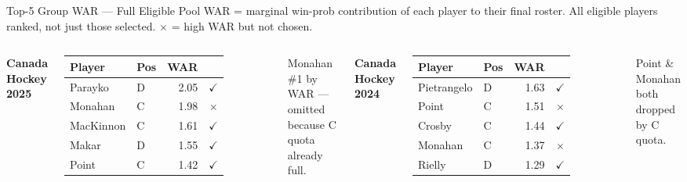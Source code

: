 \documentclass[aspectratio=169,11pt]{beamer}
\newcommand{\good}[1]{\textcolor{bgrn}{\textbf{#1}}}
\newcommand{\bad}[1]{\textcolor{bred}{\textbf{#1}}}
\begin{document}
\begin{frame}{Top-5 Group WAR — Full Eligible Pool}
{\small\color{steel}WAR = marginal win-prob contribution of each player to their final roster. All eligible players ranked, not just those selected. \bad{$\times$} = high WAR but not chosen.}
\vspace{0.4em}

\begin{columns}[T]
\textbf{\small Canada Hockey 2025}
\vspace{0.2em}
\scriptsize\begin{tabular}{@{}llrc@{}}
\toprule
Player & Pos & WAR & \\
\midrule
Parayko   & D & 2.05 & \good{$\checkmark$} \\
Monahan   & C & 1.98 & \bad{$\times$} \\
MacKinnon & C & 1.61 & \good{$\checkmark$} \\
Makar     & D & 1.55 & \good{$\checkmark$} \\
Point     & C & 1.42 & \good{$\checkmark$} \\
\bottomrule
\end{tabular}
\vspace{0.3em}

{\scriptsize\color{steel}Monahan \#1 by WAR — omitted\\because C quota already full.}

\textbf{\small Canada Hockey 2024}
\vspace{0.2em}
\scriptsize\begin{tabular}{@{}llrc@{}}
\toprule
Player & Pos & WAR & \\
\midrule
Pietrangelo & D & 1.63 & \good{$\checkmark$} \\
Point     & C & 1.51 & \bad{$\times$} \\
Crosby      & C & 1.44 & \good{$\checkmark$} \\
Monahan   & C & 1.37 & \bad{$\times$} \\
Rielly      & D & 1.29 & \good{$\checkmark$} \\
\bottomrule
\end{tabular}
\vspace{0.3em}

{\scriptsize\color{steel}Point \& Monahan both\\dropped by C quota.}


\end{columns}
\end{frame}
\end{document}
